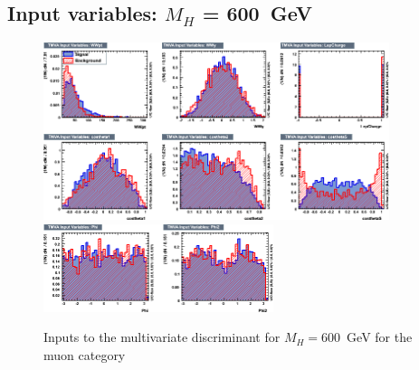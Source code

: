 \subsection{Input variables: \texorpdfstring{$M_H$}{M(H)} = 600~GeV}
\begin{figure}[ht]
  \centering
  \includegraphics[width=0.9\textwidth]{plots/2012_MVA/TMVA_600_nJ2_mu_variables_id_c1.png}
  \includegraphics[width=0.6\textwidth]{plots/2012_MVA/TMVA_600_nJ2_mu_variables_id_c2.png}	
  \caption{\label{fig:inputs600mu}Inputs to the multivariate discriminant for $M_H = $600~GeV for the muon category}
\end{figure}
